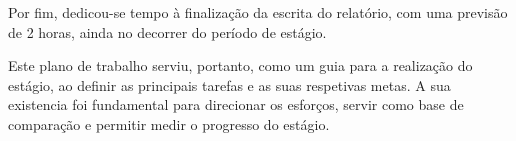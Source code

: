 Por fim, dedicou-se tempo à finalização da escrita do relatório, com uma previsão de 2 horas, ainda no decorrer do período de estágio.
\newline

Este plano de trabalho serviu, portanto, como um guia para a realização do estágio, ao definir as principais tarefas e as suas respetivas metas. A sua existencia foi fundamental para direcionar os esforços, servir como base de comparação e permitir medir o progresso do estágio.




